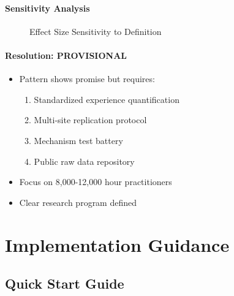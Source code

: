 \documentclass[12pt,oneside]{memoir}
\theoremstyle{plain}
\theoremstyle{definition}
\theoremstyle{remark}
\begin{document}
\subsection{Sensitivity Analysis}

\begin{figure}[h]
\centering
{}
\caption{Effect Size Sensitivity to Definition}
\end{figure}

\subsection{Resolution: PROVISIONAL}

\begin{itemize}
\item Pattern shows promise but requires:
  \begin{enumerate}
  \item Standardized experience quantification
  \item Multi-site replication protocol
  \item Mechanism test battery
  \item Public raw data repository
  \end{enumerate}
\item Focus on 8,000-12,000 hour practitioners
\item Clear research program defined
\end{itemize}

\part{Implementation Guidance}

\chapter{Quick Start Guide}
\end{document}
